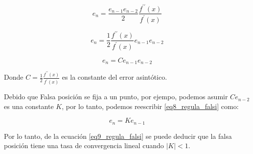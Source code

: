 \begin{displaymath}
    e_n = \frac{e_{n-1} e_{n-2}}{2} \frac{f^{\prime\prime} (x)}{f^\prime (x)}
\end{displaymath}

\begin{displaymath}
    e_n = \frac{1}{2} \frac{f^{\prime\prime} (x)}{f^\prime (x)} e_{n-1} e_{n-2}
\end{displaymath}

\begin{equation}
    \label{eq8_regula_falsi}
    e_n = C e_{n-1} e_{n-2}
\end{equation}

Donde $ C = \frac{1}{2} \frac{f^{\prime\prime} (x)}{f^\prime (x)} $ es la constante del error asintótico.\newline

Debido que Falsa posición se fija a un punto, por ejempo, podemos asumir $ Ce_{n-2} $ es una constante $ K $, por lo tanto, podemos reescribir \eqref{eq8_regula_falsi} como:

\begin{equation}
    \label{eq9_regula_falsi}
    e_n = K e_{n-1}
\end{equation}

Por lo tanto, de la ecuación \eqref{eq9_regula_falsi} se puede deducir que la falsa posición tiene una tasa de convergencia lineal cuando $ |K| < 1 $.